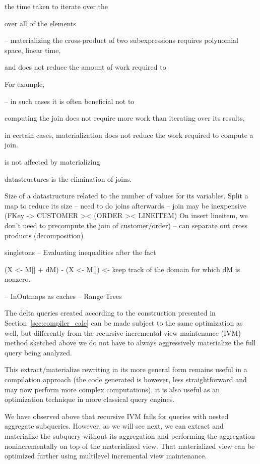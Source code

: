  the time taken to iterate over the 

 over all of the elements 


 -- materializing the cross-product of two subexpressions requires polynomial space, linear time, 


and does not reduce the amount of work required to 


For example, 



 -- in such cases it is often beneficial not to 

computing the join does not require more work than iterating over its results, 


 in certain cases, materialization does not reduce the work required to compute a join.  



 is not affected by materializing 

 datastructures is the elimination of joins.  

Size of a datastructure related to the number of values for its variables.
Split a map to reduce its size 
  -- need to do joins afterwards
  -- join may be inexpensive (FKey -> CUSTOMER >< (ORDER >< LINEITEM) On insert lineitem, we don't need to precompute the join of customer/order)
  -- can separate out cross products (decomposition)

  
singletons
  -- Evaluating inequalities after the fact

(X <- M[] + dM) - (X <- M[])  <- keep track of the domain for which dM is nonzero.

  -- InOutmaps as caches
  -- Range Trees




The delta queries created according to the construction presented in
Section~\ref{sec:compiler_calc} can be made subject to the same optimization as well, but differently from the recursive
incremental view maintenance (IVM) method sketched above we do not have to always aggressively materialize the full query being analyzed.

This extract/materialize rewriting in its more general form remains useful in a compilation
approach (the code generated is however, less straightforward and may now
perform more complex computations), it is also useful as an optimization technique in more
classical query engines.

We have observed above that recursive IVM fails for queries with nested aggregate subqueries. However,
as we will see next, we can extract and materialize the subquery without its aggregation and performing the aggregation nonincrementally on top of the materialized view. That materialized view can be optimized further using multilevel incremental view maintenance.

